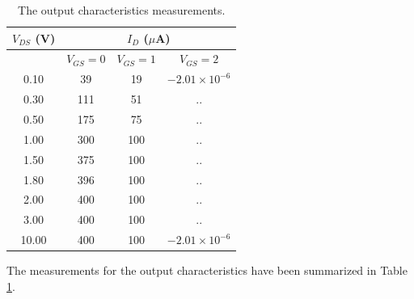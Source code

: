 \documentclass{article}
\begin{document}
	
	\begin{table}[!h]
		\centering
		\begin{tabular}{|c|c|c|c|}
		\hline
			$V_{DS}$ (V) & \multicolumn{3}{c}{$I_D$ ($\mu$A)} \\
			\hline
			& $V_{GS}=0$     & $V_{GS}=1$     & $V_{GS}=2$     \\
		\hline
			0.10         & 39          & 19          & $-2.01\times 10^{-6}$      \\
			0.30         & 111         & 51          & ..             \\
			0.50         & 175         & 75          & ..             \\
			1.00         & 300         & 100         & ..             \\
			1.50         & 375         & 100         & ..             \\
			1.80         & 396         & 100         & ..             \\
			2.00         & 400         & 100         & ..             \\
			3.00         & 400         & 100         & ..             \\
			10.00        & 400         & 100         & $-2.01\times 10^{-6}$\\
		\hline
		\end{tabular}
		\caption{The output characteristics measurements.}
		\label{tab:out}
	\end{table}
	
	The measurements for the output characteristics have been summarized in Table \ref{tab:out}.
	
\end{document}
